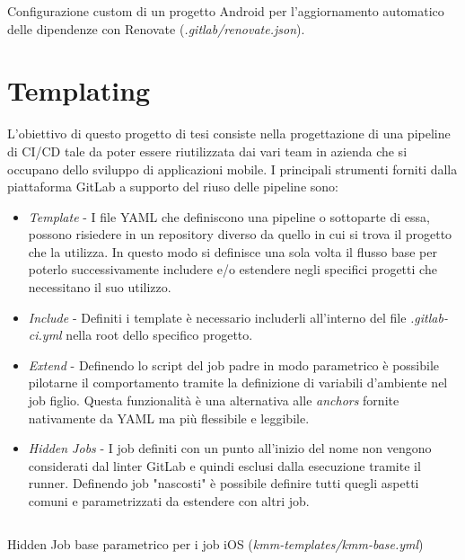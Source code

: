 \begin{listing}[H]
\inputminted{json}{code/4-renovacustom}
\caption{Configurazione custom di un progetto Android per l'aggiornamento automatico delle dipendenze con Renovate (\textit{.gitlab/renovate.json}).}
\end{listing}

\section{Templating}
L'obiettivo di questo progetto di tesi consiste nella progettazione di una pipeline di CI/CD tale da poter essere riutilizzata dai vari team in azienda che si occupano dello sviluppo di applicazioni mobile. I principali strumenti forniti dalla piattaforma GitLab a supporto del riuso delle pipeline sono:
\begin{itemize}
    \item \textit{Template} - I file YAML che definiscono una pipeline o sottoparte di essa, possono risiedere in un repository diverso da quello in cui si trova il progetto che la utilizza. In questo modo si definisce una sola volta il flusso base per poterlo successivamente includere e/o estendere negli specifici progetti che necessitano il suo utilizzo.
    \item \textit{Include} - Definiti i template è necessario includerli all'interno del file \textit{.gitlab-ci.yml} nella root dello specifico progetto.
    \item \textit{Extend} - Definendo lo script del job padre in modo parametrico è possibile pilotarne il comportamento tramite la definizione di variabili d'ambiente nel job figlio. Questa funzionalità è una alternativa alle \textit{anchors} fornite nativamente da YAML ma più flessibile e leggibile.
    \item \textit{Hidden Jobs} - I job definiti con un punto all'inizio del nome non vengono considerati dal linter GitLab e quindi esclusi dalla esecuzione tramite il runner. Definendo job "nascosti" è possibile definire tutti quegli aspetti comuni e parametrizzati da estendere con altri job.
\end{itemize}

\begin{listing}[H]
\inputminted{yaml}{code/4-templating2}
\caption{Hidden Job base parametrico per i job iOS (\textit{kmm-templates/kmm-base.yml})}
\end{listing}

